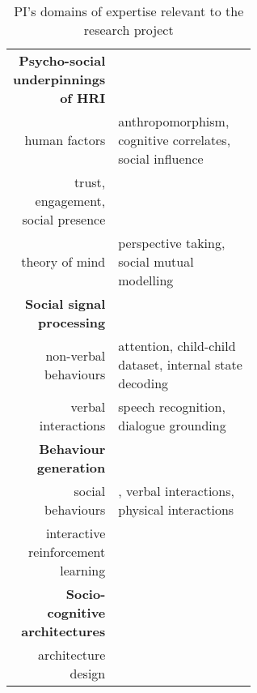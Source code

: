     \vspace{2em}


\begin{table}[h!]
    \centering
    \caption{\small PI's domains of expertise relevant to the research project}
    \begin{tabular}{rp{0.6\linewidth}}
        \toprule
        \textbf{Psycho-social underpinnings of HRI} \\  
        human factors & \small anthropomorphism\cite{lemaignan2014dynamics}, cognitive
        correlates\cite{lemaignan2014cognitive}, social influence\cite{winkle2019effective} \\
        trust, engagement, social presence & \small \cite{flook2019impact}\cite{lemaignan2015youre}\cite{fink2014which}\cite{irfan2018social}\cite{wijnen2020performing} \\
        theory of mind & \small perspective taking\cite{ros2010which, warnier2012when}, social mutual modelling\cite{lemaignan2015mutual,dillenbourg2016symmetry} \\
        \midrule
        \textbf{Social signal processing}\\
        non-verbal behaviours & \small attention\cite{lemaignan2016realtime},
        child-child dataset\cite{lemaignan2018pinsoro}, internal state decoding\cite{bartlett2019what} \\
        verbal interactions & \small speech recognition\cite{kennedy2017child}, dialogue grounding\cite{lemaignan2011grounding} \\
        \midrule
        \textbf{Behaviour generation} \\
        social behaviours & \small \cite{lallee2011towards}, verbal interactions\cite{wallbridge2019generating, wallbridge2019towards}, physical interactions\cite{gharbi2013natural} \\
        interactive reinforcement learning & \small
        \cite{senft2017leveraging,senft2017supervised, senft2019teaching,  winkle2020insitu} \\
        \midrule
        \textbf{Socio-cognitive architectures} \\
        architecture design & \small \cite{lemaignan2017artificial, baxter2016cognitive,lemaignan2014challenges,lallee2012towards, mallet2010genom3} \\

\end{tabular}
\end{table}
